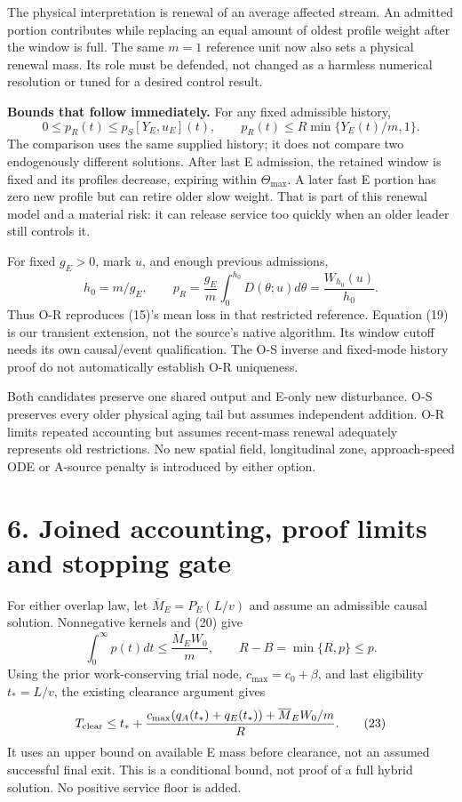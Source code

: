 \documentclass[11pt,a4paper]{article}
\begin{document}
The physical interpretation is renewal of an average affected stream.
An admitted portion contributes while replacing an equal amount of oldest
profile weight after the window is full. The same $m=1$ reference unit now
also sets a physical renewal mass. Its role must be defended, not changed
as a harmless numerical resolution or tuned for a desired control result.

\textbf{Bounds that follow immediately.} For any fixed admissible history,
\begin{equation}
 0\leq p_R(t)\leq p_S[Y_E,u_E](t),\qquad
 p_R(t)\leq R\min\{Y_E(t)/m,1\}. \tag{20}
\end{equation}
The comparison uses the same supplied history; it does not compare two
endogenously different solutions. After last E admission, the retained
window is fixed and its profiles decrease, expiring within
$\Theta_{\max}$. A later fast E portion has zero new profile but can retire
older slow weight. That is part of this renewal model and a material risk:
it can release service too quickly when an older leader still controls it.

For fixed $g_E>0$, mark $u$, and enough previous admissions,
\begin{equation}
 h_0=m/g_E,\qquad
 p_R=\frac{g_E}{m}\int_0^{h_0}D(\theta;u)d\theta
      =\frac{W_{h_0}(u)}{h_0}. \tag{21}
\end{equation}
Thus O-R reproduces (15)'s mean loss in that restricted reference. Equation
(19) is our transient extension, not the source's native algorithm. Its
window cutoff needs its own causal/event qualification. The O-S inverse
and fixed-mode history proof do not automatically establish O-R uniqueness.

Both candidates preserve one shared output and E-only new disturbance.
O-S preserves every older physical aging tail but assumes independent
addition. O-R limits repeated accounting but assumes recent-mass renewal
adequately represents old restrictions. No new spatial field, longitudinal
zone, approach-speed ODE or A-source penalty is introduced by either option.

\newpage
\section*{6. Joined accounting, proof limits and stopping gate}

For either overlap law, let $\overline M_E=P_E(L/v)$ and assume an
admissible causal solution. Nonnegative kernels and (20) give
\begin{equation}
 \int_0^\infty p(t)dt\leq\frac{\overline M_EW_0}{m},\qquad
 R-B=\min\{R,p\}\leq p. \tag{22}
\end{equation}
Using the prior work-conserving trial node, $c_{\max}=c_0+\beta$, and
last eligibility $t_*=L/v$, the existing clearance argument gives
\begin{equation}
 T_{\rm clear}\leq t_*+
 \frac{c_{\max}(q_A(t_*)+q_E(t_*))+\overline M_EW_0/m}{R}. \tag{23}
\end{equation}
It uses an upper bound on available E mass before clearance, not an assumed
successful final exit. This is a conditional bound, not proof of a full
hybrid solution. No positive service floor is added.
\end{document}

